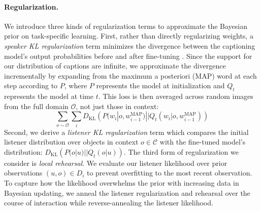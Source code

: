 \paragraph{Regularization.} 
We introduce three kinds of regularization terms to approximate the Bayesian prior on task-specific learning.
First, rather than directly regularizing weights, a \emph{speaker KL regularization} term minimizes the divergence between the captioning model's output probabilities before and after fine-tuning \cite{yu2013kl, galashov_information_2018}. %
Since the support for our distribution of captions are infinite, we approximate the divergence incrementally by expanding from the maximum a posteriori (MAP) word at each step according to $P$, where $P$ represents the model at initialization and $Q_t$ represents the model at time $t$. 
This loss is then averaged across random images from the full domain $\mathcal{O}$, not just those in context:
\begin{equation}
	\sum_{o\sim\mathcal{O}}
	 			 \sum_i 
				 D_{\mathrm{KL}}
				 \left(
				 P(w_i |o, w^{\mathrm{MAP}}_{i-1})
				 ||
				 Q_t(w_i|o, w^{\mathrm{MAP}}_{i-1})
				 \right)
\label{eq:speaker_reg}
\end{equation}
Second, we derive a \emph{listener KL regularization} term which compares the initial listener distribution over objects in context $o \in \mathcal{C}$ with the fine-tuned model's distribution: $D_{\mathrm{KL}}\left(P(o | u)||Q_t(o | u)\right).$
The third form of regularization we consider is \emph{local rehearsal}.
We evaluate our listener likelihood over prior observations $(u,o) \in D_i$ to prevent overfitting to the most recent observation.
To capture how the likelihood overwhelms the prior with increasing data in Bayesian updating, we anneal the listener regularization and rehearsal over the course of interaction while reverse-annealing the listener likelihood.

